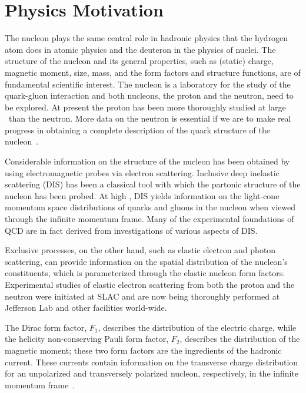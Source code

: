 %
\section{Physics Motivation}

\indent
The nucleon plays the same central role in hadronic physics that the hydrogen atom does in atomic physics and the deuteron in the physics of nuclei. 
The structure of the nucleon and its general properties, such as (static) charge, magnetic moment, size, mass, and the form factors and structure functions,
are of fundamental scientific interest.  
The nucleon is a laboratory for the study of the quark-gluon interaction and both nucleons, the proton and the neutron, need to be explored.  
At present the proton has been more thoroughly studied at large \qsq~than the neutron.
More data on the neutron is essential if we are to make real progress in obtaining a complete description of the quark structure of the nucleon~\cite{Cates:2011pz}.

Considerable information on the structure of the nucleon has been obtained by using electromagnetic probes via electron scattering.
Inclusive deep inelastic scattering (DIS) has been a classical tool with which the partonic structure of the nucleon has been probed.
At high \qsq, DIS yields information on the light-cone momentum space distributions of quarks and gluons in the nucleon when viewed
through the infinite momentum frame.
Many of the experimental foundations of QCD are in fact derived from investigations of various aspects of DIS.

Exclusive processes, on the other hand, such as elastic electron and photon scattering, can provide information on the spatial distribution
of the nucleon's constituents, which is parameterized through the elastic nucleon form factors.
%
Experimental studies of elastic electron scattering from both the proton and the neutron were initiated at SLAC and are now being thoroughly
performed at Jefferson Lab and other facilities world-wide.

The Dirac form factor, $F_1$, describes the distribution of the electric charge, while the helicity non-conserving Pauli
form factor, $F_2$, describes the distribution of the magnetic moment; these two form factors are the ingredients of the hadronic current.  
These currents contain information on the transverse charge distribution for an unpolarized and transversely polarized nucleon, respectively, 
in the infinite momentum frame~\cite{Miller:2007uy, Carlson:2007xd}.

